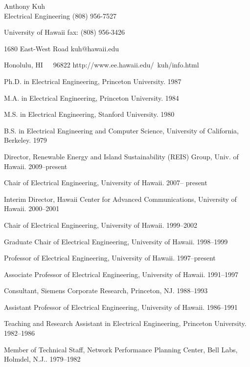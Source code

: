 

\begin{center}
Anthony Kuh \\
Electrical Engineering \hfill (808) 956-7527

University of Hawaii              \hfill fax: (808) 956-3426

1680 East-West Road               \hfill kuh@hawaii.edu

Honolulu, HI~~~96822              \hfill http://www.ee.hawaii.edu/~kuh/info.html

\end{center}

\begin{Professional Preparation}
\item Ph.D. in Electrical Engineering, Princeton University. 1987
\item M.A.  in Electrical Engineering, Princeton University. 1984
\item M.S.  in Electrical Engineering, Stanford University. 1980
\item B.S.  in Electrical Engineering and Computer Science, University of California, Berkeley. 1979
\end{Professional Preparation}

\begin{Appointments}
\item Director, Renewable Energy and Island Sustainability (REIS) Group, Univ. of Hawaii.  2009--present
\item Chair of Electrical Engineering, University of Hawaii. 2007-- present
\item Interim Director, Hawaii Center for Advanced Communications, University of Hawaii. 2000--2001
\item Chair of Electrical Engineering, University of Hawaii. 1999--2002
\item Graduate Chair of Electrical Engineering, University of Hawaii. 1998--1999
\item Professor of Electrical Engineering, University of Hawaii. 1997--present
\item Associate Professor of Electrical Engineering, University of Hawaii. 1991--1997
\item Consultant, Siemens Corporate Research, Princeton, NJ. 1988--1993
\item Assistant Professor of Electrical Engineering, University of Hawaii. 1986--1991
\item Teaching and Research Assistant in Electrical Engineering, Princeton University. 1982--1986
\item Member of Technical Staff, Network Performance Planning Center, Bell Labs, Holmdel, N.J.. 1979--1982

\end{Appointments}


